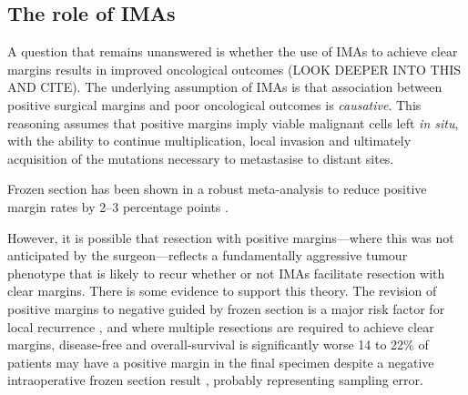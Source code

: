 \subsection{The role of IMAs}

A question that remains unanswered is whether the use of IMAs to achieve clear margins results in improved oncological outcomes (LOOK DEEPER INTO THIS AND CITE).
The underlying assumption of IMAs is that association between positive surgical margins and poor oncological outcomes is \emph{causative}.
This reasoning assumes that positive margins imply viable malignant cells left \emph{in situ}, with the ability to continue multiplication, local invasion and ultimately acquisition of the mutations necessary to metastasise to distant sites.

Frozen section has been shown in a robust meta-analysis to reduce positive margin rates by 2--3 percentage points \cite{gorpheSystematicReviewMetaanalysis2019}.

However, it is possible that resection with positive margins---where this was not anticipated by the surgeon---reflects a fundamentally aggressive tumour phenotype that is likely to recur whether or not IMAs facilitate resection with clear margins.
There is some evidence to support this theory.
The revision of positive margins to negative guided by frozen section is a major risk factor for local recurrence \cite{ettlt.PositiveFrozenSection2016}, and where multiple resections are required to achieve clear margins, disease-free and overall-survival is significantly worse \cite{mooreTransoralRoboticSurgery2018}
14 to 22\% of patients may have a positive margin in the final specimen despite a negative intraoperative frozen section result \cite{ordAccuracyFrozenSections1997, due.RefiningUtilityRole2016}, probably representing sampling error.
